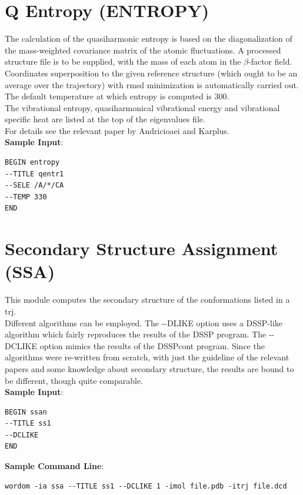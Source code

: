 \documentclass[11pt,twoside,onecolumn,a4paper,openright,notitlepage]{book}[2001/04/21]
\begin{document}
\section{Q Entropy (ENTROPY)}
The calculation of the quasiharmonic entropy is based on the diagonalization of the mass-weighted covariance matrix of the atomic fluctuations. A processed structure file is to be supplied, with the mass of each atom in the $\beta$-factor field. Coordinates superposition to the given reference structure (which ought to be an average over the trajectory) with rmsd minimization is automatically carried out. The default temperature at which entropy is computed is 300.\\
The vibrational entropy, quasiharmonical vibrational energy and vibrational specific heat are listed at the top of the eigenvalues file.\\
For details see the relevant paper by Andricioaei and Karplus\cite{2001JChPh.115.6289A}.\\

\textbf{\large Sample Input}:
\begin{verbatim}
BEGIN entropy
--TITLE qentr1
--SELE /A/*/CA
--TEMP 330
END
\end{verbatim}
\clearpage

\section{Secondary Structure Assignment (SSA)}
This module computes the secondary structure of the conformations listed in a trj.\\ Different algorithms can be employed. The -{}-DLIKE option uses a DSSP-like algorithm which fairly reproduces the results of the DSSP program\cite{DSSP}. The -{}-DCLIKE option mimics the results of the DSSPcont program\cite{DSSP:cont1, DSSP:cont2}. Since the algorithms were re-written from scratch, with just the guideline of the relevant papers and some knowledge about secondary structure, the results are bound to be different, though quite comparable.\\

\textbf{\large Sample Input}:
\begin{verbatim}
BEGIN ssan
--TITLE ss1
--DCLIKE
END
\end{verbatim}
\textbf{\large Sample Command Line}:
\begin{verbatim}
wordom -ia ssa --TITLE ss1 --DCLIKE 1 -imol file.pdb -itrj file.dcd
\end{verbatim}
\clearpage
\end{document}
